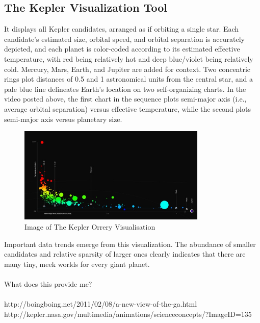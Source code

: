\documentclass[11pt
              , a4paper
              , twoside
              , openright
              ]{report}
\begin{document}
\subsection{The Kepler Visualization Tool }
It displays all Kepler candidates, arranged as if orbiting a single star. Each candidate's estimated size, orbital speed, and orbital separation is accurately depicted, and each planet is color-coded according to its estimated effective temperature, with red being relatively hot and deep blue/violet being relatively cold. Mercury, Mars, Earth, and Jupiter are added for context. Two concentric rings plot distances of 0.5 and 1 astronomical units from the central star, and a pale blue line delineates Earth's location on two self-organizing charts. In the video posted above, the first chart in the sequence plots semi-major axis (i.e., average orbital separation) versus effective temperature, while the second plots semi-major axis versus planetary size.
\begin{figure}[h!]
  \centering
      \includegraphics[width=0.8\textwidth]{images/kepler1.jpg}
  \caption{Image of The Kepler Orrery Visualisation}
\end{figure}
Important data trends emerge from this visualization. The abundance of smaller candidates and relative sparsity of larger ones clearly indicates that there are many tiny, meek worlds for every giant planet.
\\\\
What does this provide me?
\\\\
http://boingboing.net/2011/02/08/a-new-view-of-the-ga.html\\
http://kepler.nasa.gov/multimedia/animations/scienceconcepts/?ImageID=135
\end{document}
